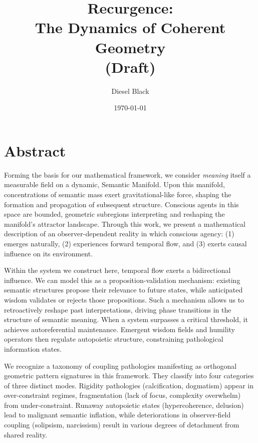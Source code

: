 \documentclass[11pt, a4paper]{report}
\title{{\Huge Recurgence}: \\ The Dynamics of Coherent Geometry \\ \vspace{1em} \small{(Draft)}}
\author{Diesel Black}
\date{\today}
\begin{document}

\maketitle

\section*{Abstract}

Forming the basis for our mathematical framework, we consider \textit{meaning} itself a measurable field on a dynamic, Semantic Manifold. Upon this manifold, concentrations of semantic mass exert gravitational-like force, shaping the formation and propagation of subsequent structure. Conscious agents in this space are bounded, geometric subregions interpreting and reshaping the manifold's attractor landscape. Through this work, we present a mathematical description of an observer-dependent reality in which conscious agency: (1) emerges naturally, (2) experiences forward temporal flow, and (3) exerts causal influence on its environment.

\vspace{1em}

Within the system we construct here, temporal flow exerts a bidirectional influence. We can model this as a proposition-validation mechanism: existing semantic structures propose their relevance to future states, while anticipated wisdom validates or rejects those propositions. Such a mechanism allows us to retroactively reshape past interpretations, driving phase transitions in the structure of semantic meaning. When a system surpasses a critical threshold, it achieves autoreferential maintenance. Emergent wisdom fields and humility operators then regulate autopoietic structure, constraining pathological information states.

\vspace{1em}

We recognize a taxonomy of coupling pathologies manifesting as orthogonal geometric pattern signatures in this framework. They classify into four categories of three distinct modes. Rigidity pathologies (calcification, dogmatism) appear in over-constraint regimes, fragmentation (lack of focus, complexity overwhelm) from under-constraint. Runaway autopoietic states (hypercoherence, delusion) lead to malignant semantic inflation, while deteriorations in observer-field coupling (solipsism, narcissism) result in various degrees of detachment from shared reality.
\end{document}
